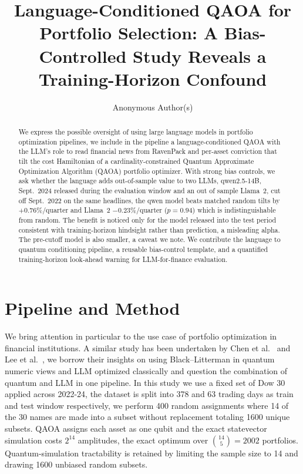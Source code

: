 \documentclass[runningheads]{llncs}
\begin{document}
\title{Language-Conditioned QAOA for Portfolio Selection: A Bias-Controlled Study Reveals a
Training-Horizon Confound}
\author{Anonymous Author(s)}
\maketitle

\begin{abstract}
We express the possible oversight of using large language models in portfolio optimization pipelines, we
include in the pipeline a language-conditioned QAOA with the LLM's role to read financial news from
RavenPack and per-asset conviction that tilt the cost Hamiltonian of a cardinality-constrained Quantum
Approximate Optimization Algorithm (QAOA) portfolio optimizer. With strong bias controls, we ask whether
the language adds out-of-sample value to two LLMs, qwen2.5-14B, Sept.\ 2024 released during the evaluation
window and an out of sample Llama~2, cut off Sept.\ 2022 on the same headlines, the qwen model beats
matched random tilts by $+0.76\%$/quarter and Llama~2 $-0.23\%$/quarter ($p=0.94$) which is
indistinguishable from random. The benefit is noticed only for the model released into the test period
consistent with training-horizon hindsight rather than prediction, a misleading alpha. The pre-cutoff
model is also smaller, a caveat we note. We contribute the language to quantum conditioning pipeline, a
reusable bias-control template, and a quantified training-horizon look-ahead warning for LLM-for-finance
evaluation.
\end{abstract}

\section{Pipeline and Method}
We bring attention in particular to the use case of portfolio optimization in financial
institutions. A similar study has been undertaken by Chen et al.~\cite{chen2023qbl} and Lee et
al.~\cite{lee2025llmbl}, we borrow their insights on using Black--Litterman in quantum numeric views and LLM optimized classically and question the combination of quantum and LLM in one pipeline. In this study
we use a fixed set of Dow 30 applied across 2022-24, the dataset is split into 378 and 63
trading days as train and test window respectively, we perform 400 random assignments where 14 of the 30 names are made into a subset without replacement totaling 1600 unique subsets. QAOA assigns each asset as one qubit and the exact statevector simulation costs $2^{14}$ amplitudes, the exact optimum over $\binom{14}{5}=2002$ portfolios. Quantum-simulation tractability is retained by limiting the sample size to 14 and drawing 1600 unbiased random subsets.
\end{document}
